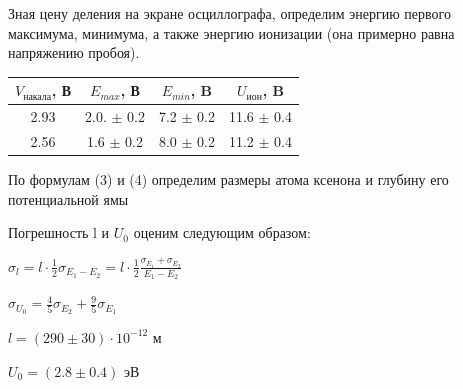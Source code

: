 \documentclass[12pt,a4paper]{article}
\begin{document}
Зная цену деления на экране осциллографа, определим энергию первого максимума, минимума, а также энергию ионизации (она примерно равна напряжению пробоя).
\hfill \break

\begin{center}
\begin{tabular}{|c|c|c|c|}
 \hline 
 $V_\text{накала}$, В  & $E_{max}$, В & $E_{min}$, B & $U_\text{ион}$, B \\ 
 \hline 
 2.93 & 2.0. $\pm$ 0.2 & 7.2 $\pm$ 0.2 & 11.6 $\pm$ 0.4 \\ 
 \hline 
 2.56  & 1.6 $\pm$ 0.2 & 8.0 $\pm$ 0.2 & 11.2 $\pm$ 0.4 \\ 
 \hline 
 \end{tabular}  
\end{center}

По формулам (3) и (4) определим размеры атома ксенона и глубину его потенциальной ямы

Погрешность l и $U_0$ оценим следующим образом:
\hfill \break

\begin{large}
$\sigma_l = l \cdot \frac{1}{2}\sigma_{E_1 - E_2} = l \cdot \frac{1}{2} \frac{\sigma_{E_1} + \sigma_{E_2}}{E_1 - E_2} $

$\sigma_{U_0} = \frac{4}{5}\sigma_{E_2} + \frac{9}{5}\sigma_{E_1}$

\begin{center}
$l = (290 \pm 30) \cdot 10^{-12} $ м 

$U_0 = (2.8 \pm 0.4)$ эВ
\end{center}

\end{large}
\end{document}
